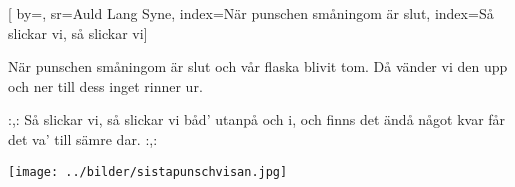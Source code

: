 

[ 		%
	by={},					%
	sr={Auld Lang Syne},					%
	index={När punschen småningom är slut}, %
	index={Så slickar vi, så slickar vi}]						%
	

\beginverse*						%
När punschen småningom är slut
och vår flaska blivit tom.
Då vänder vi den upp och ner
till dess inget rinner ur.
\endverse							%

\beginchorus						%
:,: Så slickar vi, så slickar vi
båd' utanpå och i,
och finns det ändå något kvar
får det va' till sämre dar. :,:
\endchorus

\endsong							%

\begin{intersong}
 \begin{center}
\texttt{[image: ../bilder/sistapunschvisan.jpg]} 
\end{center}
\end{intersong}